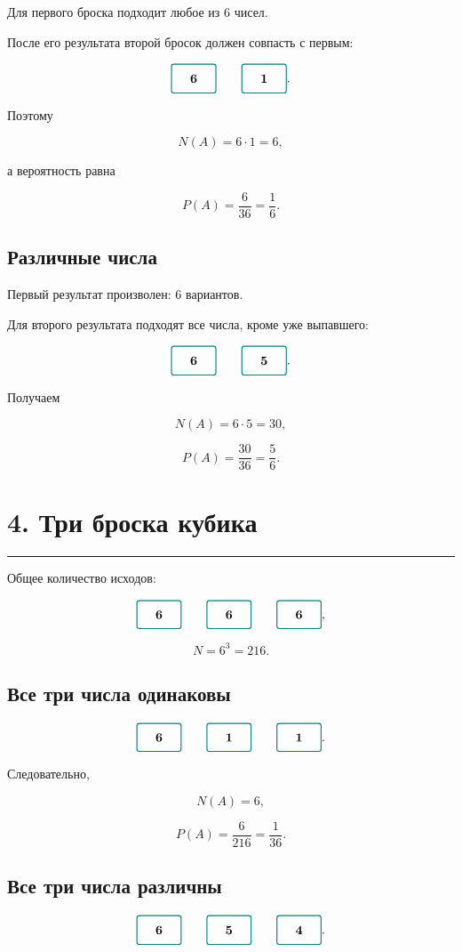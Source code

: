 \documentclass[a4paper,12pt]{article}
\newcommand{\sectionline}{%
    \vspace{0.2em}
    {\color{accent}\rule{\linewidth}{0.7pt}}
    \vspace{0.4em}
}
\newcommand{\positionbox}[1]{%
    \tikz[baseline=-0.7ex]\node[
        draw=accent,
        rounded corners=2pt,
        minimum width=1.25cm,
        minimum height=0.8cm,
        line width=0.8pt
    ]{\textbf{#1}};%
}
\begin{document}
Для первого броска подходит любое из \(6\) чисел.

После его результата второй бросок должен совпасть с первым:

\[
\positionbox{6}
\qquad
\positionbox{1}.
\]

Поэтому

\[
N(A)=6\cdot1=6,
\]

а вероятность равна

\[
\boxed{
P(A)=\frac6{36}=\frac16
}.
\]

\subsection*{Различные числа}

Первый результат произволен: \(6\) вариантов.

Для второго результата подходят все числа, кроме уже выпавшего:

\[
\positionbox{6}
\qquad
\positionbox{5}.
\]

Получаем

\[
N(A)=6\cdot5=30,
\]

\[
\boxed{
P(A)=\frac{30}{36}=\frac56
}.
\]

\newpage

\section*{4. Три броска кубика}
\sectionline

Общее количество исходов:

\[
\positionbox{6}
\qquad
\positionbox{6}
\qquad
\positionbox{6},
\]

\[
N=6^3=216.
\]

\subsection*{Все три числа одинаковы}

\[
\positionbox{6}
\qquad
\positionbox{1}
\qquad
\positionbox{1}.
\]

Следовательно,

\[
N(A)=6,
\]

\[
\boxed{
P(A)=\frac6{216}=\frac1{36}
}.
\]

\subsection*{Все три числа различны}

\[
\positionbox{6}
\qquad
\positionbox{5}
\qquad
\positionbox{4}.
\]
\end{document}
